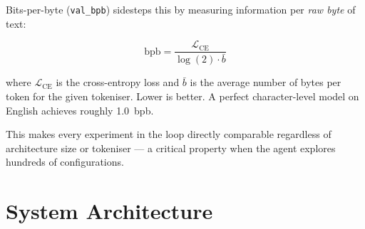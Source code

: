 \documentclass[12pt, a4paper]{article}
\newcommand{\bpb}{\texttt{val\_bpb}}
\begin{document}
Bits-per-byte (\bpb{}) sidesteps this by measuring information per \emph{raw byte} of text:

\begin{equation}
  \text{bpb} = \frac{\mathcal{L}_{\text{CE}}}{\log(2) \cdot \bar{b}}
  \label{eq:bpb}
\end{equation}

where $\mathcal{L}_{\text{CE}}$ is the cross-entropy loss and $\bar{b}$ is the average number
of bytes per token for the given tokeniser. Lower is better. A perfect character-level
model on English achieves roughly 1.0~bpb.

This makes every experiment in the loop directly comparable regardless of architecture size or
tokeniser — a critical property when the agent explores hundreds of configurations.

\section{System Architecture}
\end{document}
